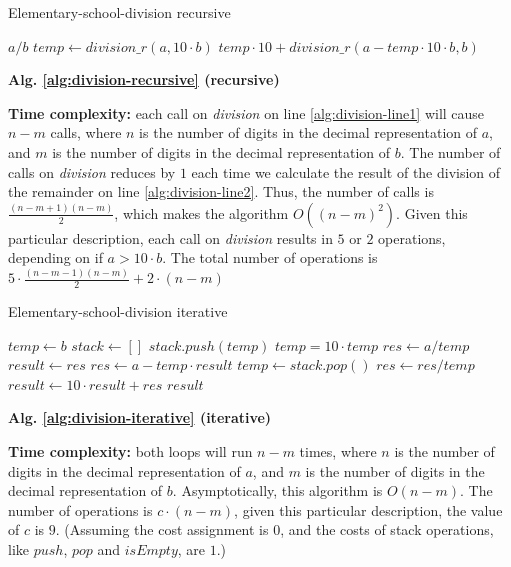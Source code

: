 \documentclass{article}
\begin{document}
\begin{description}
  \begin{algorithm}[h]
  \caption{Elementary-school-division recursive}
  \label{alg:division-recursive}
    \begin{algorithmic}[1]
        \State \Return $a / b$
      \Else {} 
        \State $temp \gets division\_r(a, 10 \cdot b)$ \label{alg:division-line1}
        \State \Return $temp \cdot 10 + division\_r(a - temp \cdot 10 \cdot b, b)$ \label{alg:division-line2}
      \EndIf
    \EndFunction
    \end{algorithmic}
  \end{algorithm}

  \textbf{Alg. \ref{alg:division-recursive} (recursive)}

  \textbf{Time complexity:} each call on \textit{division} on line \ref{alg:division-line1} will cause $n-m$ calls, where $n$ is the number of digits in the decimal representation of $a$, and $m$ is the number of digits in the decimal representation of $b$. The number of calls on \textit{division} reduces by $1$ each time we calculate the result of the division of the remainder on line \ref{alg:division-line2}. Thus, the number of calls is $\frac{(n-m+1)(n-m)}{2}$, which makes the algorithm $O((n-m)^2)$. Given this particular description, each call on \textit{division} results in $5$ or $2$ operations, depending on if $a > 10 \cdot b$. The total number of operations is $5 \cdot \frac{(n-m-1)(n-m)}{2} + 2 \cdot (n-m)$

  \begin{algorithm}[h]
  \caption{Elementary-school-division iterative}
  \label{alg:division-iterative}
    \begin{algorithmic}[1]
      \State $temp \gets b$
      \State $stack \gets []$
        \State $stack.push(temp)$
        \State $temp = 10 \cdot temp$
      \EndWhile
      \State $res \gets a / temp$
      \State $result \gets res$
        \State $res \gets a - temp \cdot result$
        \State $temp \gets stack.pop()$
        \State $res \gets res / temp$
        \State $result \gets 10 \cdot result + res$
      \EndWhile
      \State \Return $result$
    \EndFunction
    \end{algorithmic}
  \end{algorithm}

  \textbf{Alg. \ref{alg:division-iterative} (iterative)}

  \textbf{Time complexity:} both loops will run $n-m$ times, where $n$ is the number of digits in the decimal representation of $a$, and $m$ is the number of digits in the decimal representation of $b$. Asymptotically, this algorithm is $O(n-m)$. The number of operations is $c \cdot (n-m)$, given this particular description, the value of $c$ is $9$. (Assuming the cost assignment is $0$, and the costs of stack operations, like $push$, $pop$ and $isEmpty$, are $1$.)


\end{description}
\end{document}
